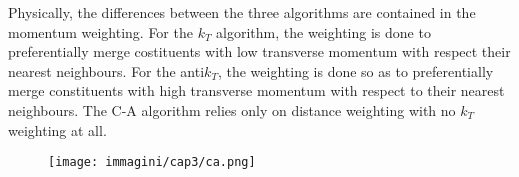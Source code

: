 Physically, the differences between the three algorithms are contained in the momentum weighting.  For the $k_T$ algorithm, the weighting is done to preferentially merge costituents with low transverse momentum with respect their nearest neighbours. 
For the anti$k_T$, the weighting is done so as to preferentially merge constituents with high transverse momentum with respect to their nearest neighbours.
The C-A algorithm relies only on distance weighting with no $k_T$ weighting at all.
\begin{figure}[h!]
    \centering
    \texttt{[image: immagini/cap3/ca.png]}
    \caption{}
    \label{fig:cambridge_aachen_algorithm}
\end{figure}